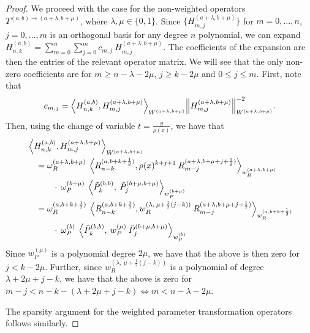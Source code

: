 \documentclass[11pt, oneside]{article}   	%
\newcommand{\half}{\frac{1}{2}}
\newcommand{\hdop}{H}
\newcommand{\hdopnkab}{\hdop_{n,k}^{(a,b)}}
\newcommand{\jac}{{\tilde P}}
\newcommand{\genjac}{R}
\newcommand{\genjacnmk}{\genjac_{n-k}}
\newcommand{\genjacmmj}{\genjac_{m-j}}
\newcommand{\genjacw}{w_\genjac}
\newcommand{\jacw}{w_P}
\newcommand{\normgenjac}{\omega_\genjac}
\newcommand{\normjac}{\omega_P}
\begin{document}
\begin{proof}
We proceed with the case for the non-weighted operators $T^{(a,b)\to(a+\lambda,b+\mu)}$, where $\lambda, \mu \in \{0,1\}$. Since $\{\hdop^{(a+\lambda, b+\mu)}_{m,j}\}$ for $m = 0,\dots,n$, $j = 0,\dots,m$ is an orthogonal basis for any degree $n$ polynomial, we can expand $\hdopnkab = \sum_{m=0}^{n} \sum_{j=0}^m c_{m,j} \: \hdop^{(a+\lambda, b+\mu)}_{m,j}$. The coefficients of the expansion are then the entries of the relevant operator matrix. We will see that the only non-zero coefficients are for $m \ge n - \lambda - 2\mu $, $j \ge k-2\mu$ and $0 \le j \le m$. First, note that
\begin{align*}
	c_{m,j} = {\ip< \hdopnkab, \hdop^{(a+\lambda, b+\mu)}_{m,j} >_{W^{(a+\lambda, b+\mu)}}}{\norm{\hdop^{(a+\lambda, b+\mu)}_{m,j}}^{-2}_{W^{(a+\lambda, b+\mu)}}}.
\end{align*}
Then, using the change of variable $t = \frac{y}{\rho(x)}$, we have that
\begin{align*}
	&\ip< \hdopnkab, \hdop^{(a+\lambda, b+\mu)}_{m,j} >_{W^{(a+\lambda, b+\mu)}} \\
	&\quad = \normgenjac^{(a+\lambda, b+\mu)} \: \ip< \genjacnmk^{(a,b+k+\half)}, \rho(x)^{k+j+1} \: \genjacmmj^{(a+\lambda,b+\mu+j+\half)} >_{\genjacw^{(a+\lambda,b+\mu)}} \\ 
	&\quad \quad \quad \cdot \: \normjac^{(b+\mu)} \: \ip< \jac_k^{(b,b)}, \: \jac_{j}^{(b+\mu,b+\mu)} >_{\jacw^{(b+\mu)}} \\
	&\quad= \normgenjac^{(a, b+k+\half)} \: \ip< \genjacnmk^{(a,b+k+\half)}, \genjacw^{(\lambda, \: \mu+\half(j-k))} \: \genjacmmj^{(a+\lambda,b+\mu+j+\half)} >_{\genjacw^{(a,b+k+\half)}} \\
	&\quad \quad \quad \cdot \: \normjac^{(b)} \: \ip< \jac_k^{(b,b)}, \: \jacw^{(\mu)} \: \jac_{j}^{(b+\mu,b+\mu)} >_{\jacw^{(b)}}
\end{align*}
Since $\jacw^{(\mu)}$ is a polynomial degree $2\mu$, we have that the above is then zero for $j < k-2\mu$. Further, since $\genjacw^{(\lambda, \: \mu+\half(j-k))}$ is a polynomial of degree $\lambda + 2\mu + j - k$, we have that the above is zero for $m-j < n-k - (\lambda + 2\mu + j - k) \iff m < n - \lambda - 2\mu$.

The sparsity argument for the weighted parameter transformation operators follows similarly.
\end{proof}
\end{document}
